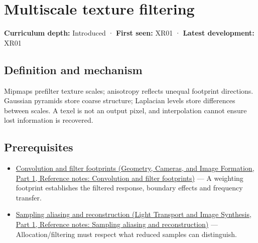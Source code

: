 \hypertarget{appendix-b677a85ba76f}{}\label{referencestart:appendix-b677a85ba76f}
\section{Multiscale texture filtering}\label{appendix-b677a85ba76f-multiscale-texture-filtering}

\hypertarget{appendix-b677a85ba76f-multiscale-texture-filtering}{}

\textbf{Curriculum depth:} Introduced · \textbf{First seen:} XR01 · \textbf{Latest development:} XR01

\begin{allmightroledefinition}

\subsection{Definition and mechanism}\label{appendix-b677a85ba76f-definition-and-mechanism}

\hypertarget{appendix-b677a85ba76f-definition-and-mechanism}{}

Mipmaps prefilter texture scales; anisotropy reflects unequal footprint directions. Gaussian pyramids store coarse structure; Laplacian levels store differences between scales. A texel is not an output pixel, and interpolation cannot ensure lost information is recovered.

\end{allmightroledefinition}

\subsection{Prerequisites}\label{appendix-b677a85ba76f-prerequisites}

\hypertarget{appendix-b677a85ba76f-prerequisites}{}

\begin{itemize}
\tightlist
\item
  \href{../03-Geometry-Cameras-and-Image-Formation-P01/main.pdf\#appendix-d5b3c692d9f0}{Convolution and filter footprints (Geometry, Cameras, and Image Formation, Part 1, Reference notes: Convolution and filter footprints)} --- A weighting footprint establishes the filtered response, boundary effects and frequency transfer.
\item
  \href{../04-Light-Transport-and-Image-Synthesis-P01/main.pdf\#appendix-6a7869dd79a6}{Sampling aliasing and reconstruction (Light Transport and Image Synthesis, Part 1, Reference notes: Sampling aliasing and reconstruction)} --- Allocation/filtering must respect what reduced samples can distinguish.
\end{itemize}

